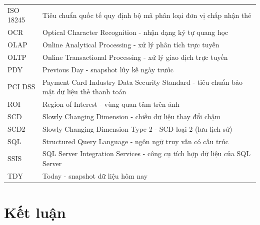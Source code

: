 \documentclass[oneside, a4paper]{book}
\theoremstyle{plain}
\theoremstyle{definition}
\theoremstyle{remark}
\renewcommand{\headrulewidth}{0.4pt}
\renewcommand{\headrulewidth}{0pt}
\begin{document}
\begin{longtable}{@{\hspace{-0.1cm}} l @{\hspace{1.2cm}} p{11.5cm}}
    ISO 18245 & Tiêu chuẩn quốc tế quy định bộ mã phân loại đơn vị chấp nhận thẻ \\
    OCR   & Optical Character Recognition - nhận dạng ký tự quang học\\
    OLAP  & Online Analytical Processing - xử lý phân tích trực tuyến\\
    OLTP  & Online Transactional Processing - xử lý giao dịch trực tuyến\\
    PDY   & Previous Day - snapshot lũy kế ngày trước\\
    PCI DSS & Payment Card Industry Data Security Standard - tiêu chuẩn bảo mật dữ liệu thẻ thanh toán\\
    ROI   & Region of Interest - vùng quan tâm trên ảnh\\
    SCD   & Slowly Changing Dimension - chiều dữ liệu thay đổi chậm\\
    SCD2  & Slowly Changing Dimension Type 2 - SCD loại 2 (lưu lịch sử)\\
    SQL   & Structured Query Language - ngôn ngữ truy vấn có cấu trúc\\
    SSIS  & SQL Server Integration Services - công cụ tích hợp dữ liệu của SQL Server\\
    TDY   & Today - snapshot dữ liệu hôm nay\\
\end{longtable}

\clearpage
{} %
\setcounter{page}{1} %
\pagestyle{fancy}
\fancyhf{}
\fancyhead[R]{\small\nouppercase{\leftmark}}   %
\fancyfoot[C]{\thepage}                        %
\renewcommand{\headrulewidth}{0.4pt}






\pagestyle{plain} %

\chapter*{Kết luận}
\end{document}
